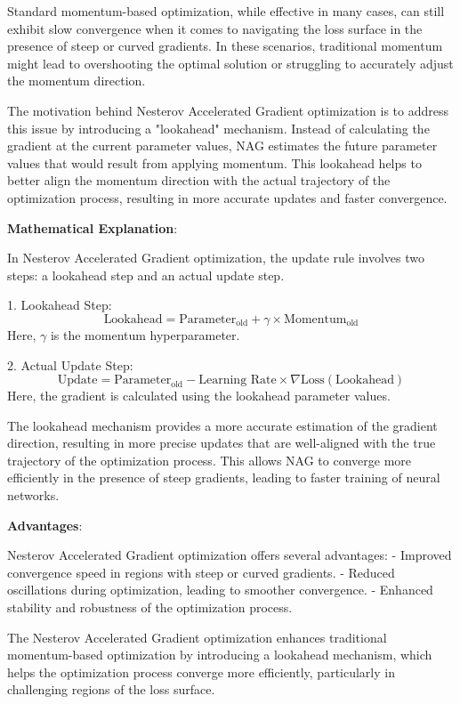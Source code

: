 \documentclass{report}
\begin{document}
Standard momentum-based optimization, while effective in many cases, can still exhibit slow convergence when it comes to navigating the loss surface in the presence of steep or curved gradients. In these scenarios, traditional momentum might lead to overshooting the optimal solution or struggling to accurately adjust the momentum direction.

The motivation behind Nesterov Accelerated Gradient optimization is to address this issue by introducing a "lookahead" mechanism. Instead of calculating the gradient at the current parameter values, NAG estimates the future parameter values that would result from applying momentum. This lookahead helps to better align the momentum direction with the actual trajectory of the optimization process, resulting in more accurate updates and faster convergence.

\textbf{Mathematical Explanation}:

In Nesterov Accelerated Gradient optimization, the update rule involves two steps: a lookahead step and an actual update step.

1. Lookahead Step:
\[ \text{Lookahead} = \text{Parameter}_\text{old} + \gamma \times \text{Momentum}_\text{old} \]
Here, \(\gamma\) is the momentum hyperparameter.

2. Actual Update Step:
\[ \text{Update} = \text{Parameter}_\text{old} - \text{Learning Rate} \times \nabla \text{Loss}(\text{Lookahead}) \]
Here, the gradient is calculated using the lookahead parameter values.

The lookahead mechanism provides a more accurate estimation of the gradient direction, resulting in more precise updates that are well-aligned with the true trajectory of the optimization process. This allows NAG to converge more efficiently in the presence of steep gradients, leading to faster training of neural networks.

\textbf{Advantages}:

Nesterov Accelerated Gradient optimization offers several advantages:
- Improved convergence speed in regions with steep or curved gradients.
- Reduced oscillations during optimization, leading to smoother convergence.
- Enhanced stability and robustness of the optimization process.

The Nesterov Accelerated Gradient optimization enhances traditional momentum-based optimization by introducing a lookahead mechanism, which helps the optimization process converge more efficiently, particularly in challenging regions of the loss surface.
\end{document}
